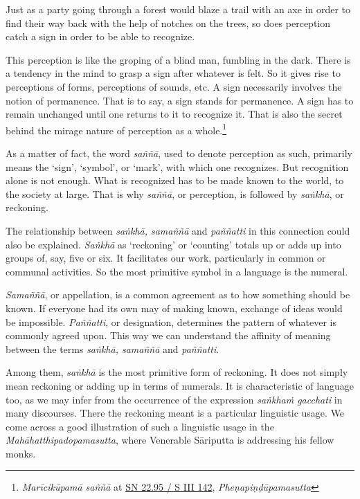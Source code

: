 Just as a party going through a forest would blaze a trail with an axe in order to find their way back with the help of notches on the trees, so does perception catch a sign in order to be able to recognize.

\enlargethispage{2\baselineskip}

This perception is like the groping of a blind man, fumbling in the dark. There is a tendency in the mind to grasp a sign after whatever is felt. So it gives rise to perceptions of forms, perceptions of sounds, etc. A sign necessarily involves the notion of permanence. That is to say, a sign stands for permanence. A sign has to remain unchanged until one returns to it to recognize it. That is also the secret behind the mirage nature of perception as a whole.\footnote{\emph{Marīcikūpamā saññā} at \href{https://suttacentral.net/sn22.95/pli/ms}{SN 22.95 / S III 142}, \emph{Pheṇapiṇḍūpamasutta}}

As a matter of fact, the word \emph{saññā}, used to denote perception as such, primarily means the `sign', `symbol', or `mark', with which one recognizes. But recognition alone is not enough. What is recognized has to be made known to the world, to the society at large. That is why \emph{saññā}, or perception, is followed by \emph{saṅkhā}, or reckoning.

The relationship between \emph{saṅkhā, samaññā} and \emph{paññatti} in this connection could also be explained. \emph{Saṅkhā} as `reckoning' or `counting' totals up or adds up into groups of, say, five or six. It facilitates our work, particularly in common or communal activities. So the most primitive symbol in a language is the numeral.

\emph{Samaññā}, or appellation, is a common agreement as to how something should be known. If everyone had its own may of making known, exchange of ideas would be impossible. \emph{Paññatti}, or designation, determines the pattern of whatever is commonly agreed upon. This way we can understand the affinity of meaning between the terms \emph{saṅkhā, samaññā} and \emph{paññatti}.

Among them, \emph{saṅkhā} is the most primitive form of reckoning. It does not simply mean reckoning or adding up in terms of numerals. It is characteristic of language too, as we may infer from the occurrence of the expression \emph{saṅkhaṁ gacchati} in many discourses. There the reckoning meant is a particular linguistic usage. We come across a good illustration of such a linguistic usage in the \emph{Mahāhatthipadopamasutta}, where Venerable Sāriputta is addressing his fellow monks.

